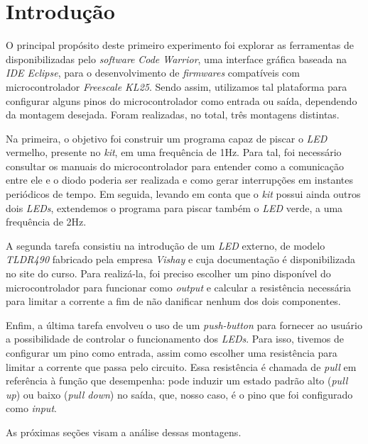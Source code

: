\section {Introdução}

O principal propósito deste primeiro experimento foi explorar as ferramentas de
disponibilizadas pelo \textit{software} \textit{Code Warrior}, uma interface
gráfica baseada na \textit{IDE Eclipse}, para o desenvolvimento de
\textit{firmwares} compatíveis com microcontrolador \textit{Freescale KL25}.
Sendo assim, utilizamos tal plataforma para configurar alguns pinos do
microcontrolador como entrada ou saída, dependendo da montagem desejada. Foram
realizadas, no total, três montagens distintas.

\vspace{12pt}

Na primeira, o objetivo foi construir um programa capaz de piscar o \textit{LED}
vermelho, presente no \textit{kit}, em uma frequência de 1Hz. Para tal, foi
necessário consultar os manuais do microcontrolador para entender como a
comunicação entre ele e o diodo poderia ser realizada e como gerar interrupções
em instantes periódicos de tempo. Em seguida, levando em conta que o
\textit{kit} possui ainda outros dois \textit{LEDs}, extendemos o programa para piscar
também o \textit{LED} verde, a uma frequência de 2Hz.

\vspace{12pt}

A segunda tarefa consistiu na introdução de um \textit{LED} externo, de
modelo \textit{TLDR490} fabricado pela empresa \textit{Vishay} e cuja
documentação é disponibilizada no site do curso. Para realizá-la, foi preciso
escolher um pino disponível do microcontrolador para funcionar como
\textit{output} e calcular a resistência necessária para limitar a corrente a
fim de não danificar nenhum dos dois componentes.

\vspace{12pt}

Enfim, a última tarefa envolveu o uso de um \textit{push-button} para fornecer
ao usuário a possibilidade de controlar o funcionamento dos \textit{LEDs}. Para
isso, tivemos de configurar um pino como entrada, assim como escolher
uma resistência para limitar a corrente que passa pelo circuito. Essa
resistência é chamada de \textit{pull} em referência à função que desempenha:
pode induzir um estado padrão alto (\textit{pull up}) ou baixo (\textit{pull
down}) no saída, que, nosso caso, é o pino que foi configurado como
\textit{input}.

\vspace{12pt}

As próximas seções visam a análise dessas montagens.